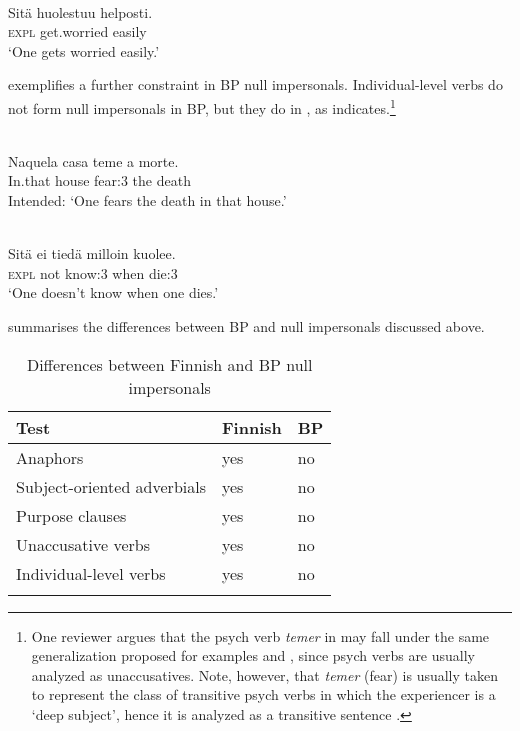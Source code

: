 \documentclass[output=paper]{LSP/langsci}
\begin{document}
\ea\label{ex:19.alexiadou}
\\
\gll Sitä huolestuu helposti.\\
 \textsc{expl} get.worried easily\\
\glt ‘One gets worried easily.’
\z


 exemplifies a further constraint in BP null impersonals. Individual-level verbs do not form null impersonals in BP, but they do in , as  indicates.\footnote{\label{fn:alexiadou:10}One reviewer argues that the psych verb \textit{temer} in  may fall under the same generalization proposed for examples  and , since psych verbs are usually analyzed as unaccusatives. Note, however, that \textit{temer} (fear) is usually taken to represent the class of transitive psych verbs in which the experiencer is a ‘deep subject’, hence it is analyzed as a transitive sentence \citep{BellettiRizzi1988}.}


\ea\label{ex:20.alexiadou}
\\
\gll {\upshape *} Naquela casa teme a morte.\\
 {} In.that house fear:3 the death\\
\glt Intended: ‘One fears the death in that house.’
\z


\ea\label{ex:21.alexiadou}
\\
\gll Sitä ei tiedä milloin kuolee.\\
 \textsc{expl} not know:3 when die:3\\
\glt ‘One doesn’t know when one dies.’
\z

\largerpage[-2]
 summarises the differences between BP and  null impersonals discussed above.

\begin{table}
\begin{tabular}{lll}
\lsptoprule
{Test} & {Finnish} & {BP}\\
\midrule
{Anaphors} & yes & no\\
\tablevspace
{Subject-oriented adverbials} & yes & no\\
\tablevspace
{Purpose clauses} & yes & no\\
\tablevspace
{Unaccusative verbs} & yes & no\\
\tablevspace
{Individual-level verbs} & yes & no\\
\lspbottomrule
\end{tabular}

\caption{Differences between Finnish and BP null impersonals}
\label{tab:1.alexiadou}
\end{table}
\end{document}
